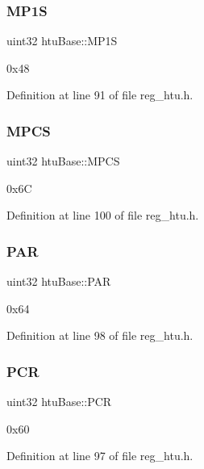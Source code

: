 \subsubsection{\texorpdfstring{M\+P1S}{MP1S}}
{\footnotesize\ttfamily uint32 htu\+Base\+::\+M\+P1S}

0x48 

Definition at line 91 of file reg\+\_\+htu.\+h.

\mbox{\label{structhtuBase_a80d6e9cf0b23d0bab03e653ff3065f65}} 
\subsubsection{\texorpdfstring{M\+P\+CS}{MPCS}}
{\footnotesize\ttfamily uint32 htu\+Base\+::\+M\+P\+CS}

0x6C 

Definition at line 100 of file reg\+\_\+htu.\+h.

\mbox{\label{structhtuBase_adbbad5f263ee2d794b2d2debddcd09c5}} 
\subsubsection{\texorpdfstring{P\+AR}{PAR}}
{\footnotesize\ttfamily uint32 htu\+Base\+::\+P\+AR}

0x64 

Definition at line 98 of file reg\+\_\+htu.\+h.

\mbox{\label{structhtuBase_a7e7d8a27e7c6d37438dd6b0e1ca00804}} 
\subsubsection{\texorpdfstring{P\+CR}{PCR}}
{\footnotesize\ttfamily uint32 htu\+Base\+::\+P\+CR}

0x60 

Definition at line 97 of file reg\+\_\+htu.\+h.

\mbox{\label{structhtuBase_adbe91195ece93ac614fc02c7f74f1612}} 
